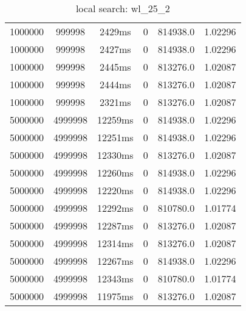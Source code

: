 \documentclass[./main.tex]{subfiles}
\begin{document}
\begin{table}
\begin{tabular}{ c | c | c | c | c | c }
        1000000 & 999998 & 2429ms & 0 & 814938.0 & 1.02296 \\
        1000000 & 999998 & 2427ms & 0 & 814938.0 & 1.02296 \\
        \rowcolor{lightgray} 1000000 & 999998 & 2445ms & 0 & 813276.0 & 1.02087 \\
        \rowcolor{lightgray} 1000000 & 999998 & 2444ms & 0 & 813276.0 & 1.02087 \\
        \rowcolor{lightgray} 1000000 & 999998 & 2321ms & 0 & 813276.0 & 1.02087 \\
        \hline
        5000000 & 4999998 & 12259ms & 0 & 814938.0 & 1.02296 \\
        5000000 & 4999998 & 12251ms & 0 & 814938.0 & 1.02296 \\
        \rowcolor{lightgray} 5000000 & 4999998 & 12330ms & 0 & 813276.0 & 1.02087 \\
        5000000 & 4999998 & 12260ms & 0 & 814938.0 & 1.02296 \\
        5000000 & 4999998 & 12220ms & 0 & 814938.0 & 1.02296 \\
        5000000 & 4999998 & 12292ms & 0 & 810780.0 & 1.01774 \\
        \rowcolor{lightgray} 5000000 & 4999998 & 12287ms & 0 & 813276.0 & 1.02087 \\
        \rowcolor{lightgray} 5000000 & 4999998 & 12314ms & 0 & 813276.0 & 1.02087 \\
        5000000 & 4999998 & 12267ms & 0 & 814938.0 & 1.02296 \\
        5000000 & 4999998 & 12343ms & 0 & 810780.0 & 1.01774 \\
        \rowcolor{lightgray} 5000000 & 4999998 & 11975ms & 0 & 813276.0 & 1.02087 \\
    \end{tabular}
    \caption{local search: wl\_25\_2}
\end{table}
\end{document}
